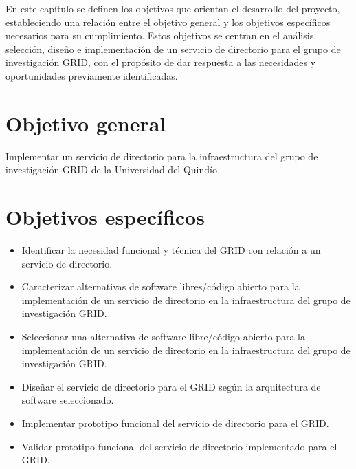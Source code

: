 \label{cap:objetivos}
\vspace*{0.7cm}

En este capítulo se definen los objetivos que orientan el desarrollo del proyecto, estableciendo una relación entre el objetivo general y los objetivos específicos necesarios para su cumplimiento. Estos objetivos se centran en el análisis, selección, diseño e implementación de un servicio de directorio para el grupo de investigación \ac{GRID}, con el propósito de dar respuesta a las necesidades y oportunidades previamente identificadas.

\section{Objetivo general}\label{sec:objetivo_general}

Implementar un servicio de directorio para la infraestructura del grupo de investigación \ac{GRID} de la Universidad del Quindío

\section{Objetivos específicos}\label{sec:objetivos_especificos}
\begin{itemize}
  \item Identificar la necesidad funcional y técnica del \ac{GRID} con relación a un servicio de directorio.
  \item Caracterizar alternativas de software libres/código abierto para la implementación de un servicio de directorio en la infraestructura del grupo de investigación \ac{GRID}.
  \item Seleccionar una alternativa de software libre/código abierto para la implementación de un servicio de directorio en la infraestructura del grupo de investigación \ac{GRID}.
  \item Diseñar el servicio de directorio para el \ac{GRID} según la arquitectura de software seleccionado.
  \item Implementar prototipo funcional del servicio de directorio para el \ac{GRID}.
  \item Validar prototipo funcional del servicio de directorio implementado para el \ac{GRID}.
\end{itemize}
